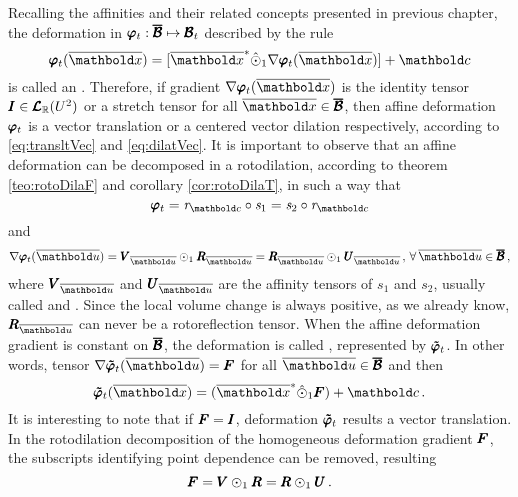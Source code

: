 Recalling the affinities and their related concepts presented in previous chapter, the deformation in $\pmb{\varphi}_t : \pmb{\overline{\mathcal{B}}} \mapsto \pmb{\mathcal{B}}_t$ described by the rule
\begin{equation}
\fua{\tnr{\varphi}_t}{\overline{\vto{x}}} =[\overline{\vto{x}}^*\hat{\odot}_1\fua{\nabla\tnr{\varphi}_t}{\overline{\vto{x}}}] + \vto{c} 
\end{equation}
is called an . Therefore, if gradient $\fua{\nabla\tnr{\varphi}_t}{\overline{\vto{x}}}$ is the identity tensor $\pmb{I}\in\pmb{\mathcal{L}}_{\mathbb{R}}(U^{2})$ or a stretch tensor for all $\overline{\vto{x}}\in\tnr{\overline{\mathcal{B}}}$, then affine deformation $\pmb{\varphi}_t$ is a vector translation or a centered vector dilation respectively, according to \eqref{eq:transltVec} and \eqref{eq:dilatVec}. It is important to observe that an affine deformation can be decomposed in a rotodilation, according to theorem \ref{teo:rotoDilaF} and corollary \ref{cor:rotoDilaT}, in such a way that 
\begin{equation}
\tnr{\varphi}_t = \mathit{r}_{\vto{c}}\circ\mathit{s}_1=\mathit{s}_2\circ\mathit{r}_{\vto{c}}
\end{equation}
and
\begin{equation}
\fua{\nabla\tnr{\varphi}_t}{\overline{\vto{u}}}=\tnr{V}_{\overline{\vto{u}}}\odot_1\tnr{R}_{\overline{\vto{u}}}=\tnr{R}_{\overline{\vto{u}}}\odot_1\tnr{U}_{\overline{\vto{u}}}\,,\,\forall\, \overline{\vto{u}}\in\tnr{\overline{\mathcal{B}}}\,, 
\end{equation}
where $\tnr{V}_{\overline{\vto{u}}}$ and $\tnr{U}_{\overline{\vto{u}}}$ are the affinity tensors of $\mathit{s}_1$ and $\mathit{s}_2$, usually called  and . Since the local volume change is always positive, as we already know, $\tnr{R}_{\overline{\vto{u}}}$ can never be a rotoreflection tensor. When the affine deformation gradient is constant on $\pmb{\overline{\mathcal{B}}}$, the deformation is called , represented by $\pmb{\tilde{\varphi}}_t$. In other words, tensor $\fua{\nabla\tnr{\tilde{\varphi}}_t}{\overline{\vto{u}}}=\tnr{F}$ for all $\overline{\vto{u}}\in\tnr{\overline{\mathcal{B}}}$ and then 
\begin{equation}\label{eq:homogDef}
\fua{\tnr{\tilde{\varphi}}_t}{\overline{\vto{x}}} =(\overline{\vto{x}}^*\hat{\odot}_1\tnr{F}) + \vto{c}\,.
\end{equation}
It is interesting to note that if $\pmb{F}=\pmb{I}$, deformation $\pmb{\tilde{\varphi}}_t$ results a vector translation. In the rotodilation decomposition of the homogeneous deformation gradient $\pmb{F}$, the subscripts identifying point dependence can be removed, resulting  
\begin{equation}
\pmb{F}=\pmb{V}\odot_1\pmb{R}=\pmb{R}\odot_1\pmb{U}\,. 
\end{equation}





